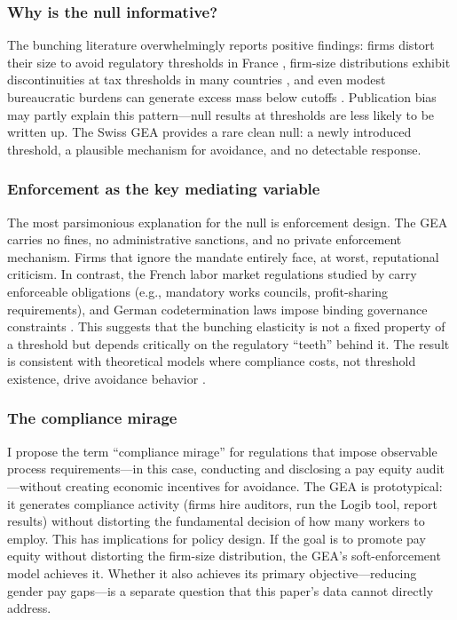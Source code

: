 \documentclass[12pt]{article}
\begin{document}
\subsubsection*{Why is the null informative?} The bunching literature overwhelmingly reports positive findings: firms distort their size to avoid regulatory thresholds in France \citep{garicano2016firm}, firm-size distributions exhibit discontinuities at tax thresholds in many countries \citep{hsieh2009misallocation, decker2014role}, and even modest bureaucratic burdens can generate excess mass below cutoffs \citep{gourio2014firm}. Publication bias may partly explain this pattern---null results at thresholds are less likely to be written up. The Swiss GEA provides a rare clean null: a newly introduced threshold, a plausible mechanism for avoidance, and no detectable response.

\subsubsection*{Enforcement as the key mediating variable} The most parsimonious explanation for the null is enforcement design. The GEA carries no fines, no administrative sanctions, and no private enforcement mechanism. Firms that ignore the mandate entirely face, at worst, reputational criticism. In contrast, the French labor market regulations studied by \citet{garicano2016firm} carry enforceable obligations (e.g., mandatory works councils, profit-sharing requirements), and German codetermination laws impose binding governance constraints \citep{mueller2020codetermination}. This suggests that the bunching elasticity is not a fixed property of a threshold but depends critically on the regulatory ``teeth'' behind it. The result is consistent with theoretical models where compliance costs, not threshold existence, drive avoidance behavior \citep{kleven2016bunching}.

\subsubsection*{The compliance mirage} I propose the term ``compliance mirage'' for regulations that impose observable process requirements---in this case, conducting and disclosing a pay equity audit---without creating economic incentives for avoidance. The GEA is prototypical: it generates compliance activity (firms hire auditors, run the Logib tool, report results) without distorting the fundamental decision of how many workers to employ. This has implications for policy design. If the goal is to promote pay equity without distorting the firm-size distribution, the GEA's soft-enforcement model achieves it. Whether it also achieves its primary objective---reducing gender pay gaps---is a separate question that this paper's data cannot directly address.
\end{document}
